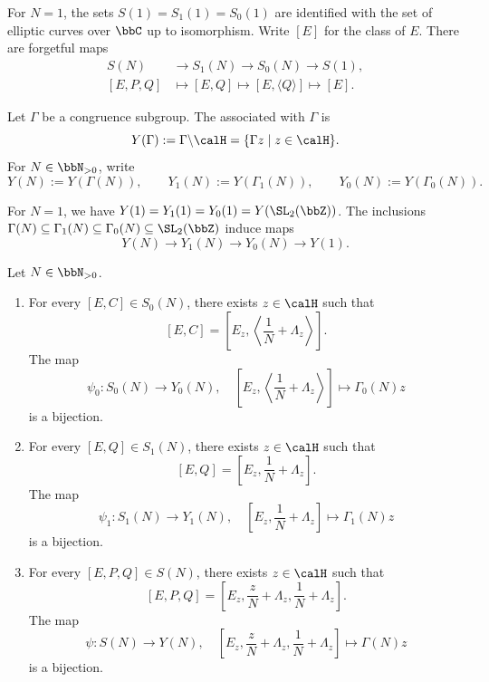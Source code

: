 \begin{remark}
    For $N = 1$, the sets $S(1) = S_1(1) = S_0(1)$ are identified with the set of elliptic curves over $\bbC$ up to isomorphism. Write $[E]$ for the class of $E$. There are forgetful maps
    \[
        \begin{aligned}
            S(N) &\longrightarrow S_1(N) \longrightarrow S_0(N) \longrightarrow S(1),\\
            [E, P, Q] &\longmapsto [E, Q] \longmapsto [E, \langle Q\rangle] \longmapsto [E].
        \end{aligned}
    \]
\end{remark}

\begin{definition}\label{Def:MF_modular_curve}
    Let $\Gamma$ be a congruence subgroup. The  associated with $\Gamma$ is
    \[
        Y(\Gamma) := \Gamma \backslash \calH = \{\Gamma z \mid z \in \calH\}.
    \]
    For $N \in \bbN_{>0}$, write
    \[
        Y(N) := Y(\Gamma(N)), \qquad Y_1(N) := Y(\Gamma_1(N)), \qquad Y_0(N) := Y(\Gamma_0(N)).
    \]
\end{definition}

\begin{remark}
    For $N = 1$, we have $Y(1) = Y_1(1) = Y_0(1) = Y(\SL_2(\bbZ))$. The inclusions $\Gamma(N) \subseteq \Gamma_1(N) \subseteq \Gamma_0(N) \subseteq \SL_2(\bbZ)$ induce maps
    \[
        Y(N) \longrightarrow Y_1(N) \longrightarrow Y_0(N) \longrightarrow Y(1).
    \]
\end{remark}

\begin{theorem}\label{Thm:MF_moduli_correspondence}
    Let $N \in \bbN_{>0}$.
    \begin{enumerate}
        \item For every $[E, C] \in S_0(N)$, there exists $z \in \calH$ such that
        \[
            [E, C] = \left[E_z, \left\langle\frac{1}{N} + \Lambda_z\right\rangle\right].
        \]
        The map
        \[
            \psi_0 : S_0(N) \longrightarrow Y_0(N), \quad \left[E_z, \left\langle\frac{1}{N} + \Lambda_z\right\rangle\right] \longmapsto \Gamma_0(N)z
        \]
        is a bijection.
        \item For every $[E, Q] \in S_1(N)$, there exists $z \in \calH$ such that
        \[
            [E, Q] = \left[E_z, \frac{1}{N} + \Lambda_z\right].
        \]
        The map
        \[
            \psi_1 : S_1(N) \longrightarrow Y_1(N), \quad \left[E_z, \frac{1}{N} + \Lambda_z\right] \longmapsto \Gamma_1(N)z
        \]
        is a bijection.
        \item For every $[E, P, Q] \in S(N)$, there exists $z \in \calH$ such that
        \[
            [E, P, Q] = \left[E_z, \frac{z}{N} + \Lambda_z, \frac{1}{N} + \Lambda_z\right].
        \]
        The map
        \[
            \psi : S(N) \longrightarrow Y(N), \quad \left[E_z, \frac{z}{N} + \Lambda_z, \frac{1}{N} + \Lambda_z\right] \longmapsto \Gamma(N)z
        \]
        is a bijection.
    \end{enumerate}
\end{theorem}

